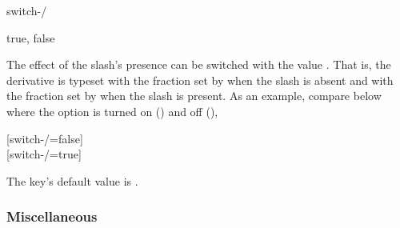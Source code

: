 \documentclass[final,british,10pt]{scrartcl}
\theoremstyle{remark}
\begin{document}
	\begin{option}{switch-/}
		\begin{values}[default = false]
			true, false
		\end{values}
		The effect of the slash's presence can be switched with the value . That is, the derivative is typeset with the fraction set by  when the slash is absent and with the fraction set by  when the slash is present. As an example, compare below where the option is turned on () and off (),
		
		\begin{example}
			\derivset{\pdv}[switch-/=false]  \\
			\derivset{\pdv}[switch-/=true]  
		\end{example}
		
		\noindent The key's default value is .
	\end{option}
	
	\subsubsection*{Miscellaneous}
	
\end{document}
